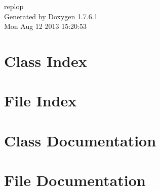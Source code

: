 \documentclass[a4paper]{book}
\begin{document}
\hypersetup{pageanchor=false,citecolor=blue}
\begin{titlepage}
\vspace*{7cm}
\begin{center}
{\Large replop }\\
\vspace*{1cm}
{\large \-Generated by Doxygen 1.7.6.1}\\
\vspace*{0.5cm}
{\small Mon Aug 12 2013 15:20:53}\\
\end{center}
\end{titlepage}
\clearemptydoublepage
{}
\tableofcontents
\clearemptydoublepage
{}
\hypersetup{pageanchor=true,citecolor=blue}
\chapter{\-Class \-Index}

\chapter{\-File \-Index}

\chapter{\-Class \-Documentation}















\chapter{\-File \-Documentation}













































\printindex
\end{document}
